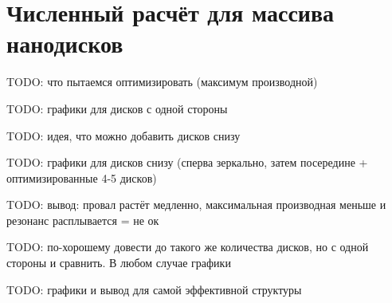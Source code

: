 \section{Численный расчёт для массива нанодисков}

TODO: что пытаемся оптимизировать (максимум производной)

TODO: графики для дисков с одной стороны

TODO: идея, что можно добавить дисков снизу

TODO: графики для дисков снизу (сперва зеркально, затем посередине + оптимизированные 4-5 дисков)

TODO: вывод: провал растёт медленно, максимальная производная меньше и резонанс расплывается = не ок

TODO: по-хорошему довести до такого же количества дисков, но с одной стороны и сравнить. В любом случае графики

TODO: графики и вывод для самой эффективной структуры